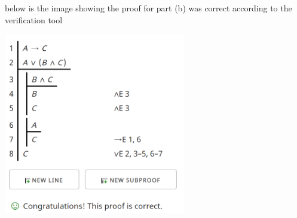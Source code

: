 \documentclass{article}
\newcommand*\fixindent{ \hspace{1pt}\\}
\begin{document}
\begin{flushleft}
below is the image showing the proof for part (b) was correct according to the verification tool
\begin{centering}\hspace*{1pt}\includegraphics[width=300px, height = 300px]{3b.png}\end{centering}
\end{flushleft}
\fixindent{}
\end{document}
